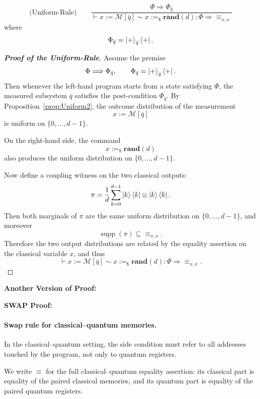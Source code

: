 \documentclass{report}
\theoremstyle{defn_style}
\begin{document}
\begin{equation*}
    \text{({Uniform-Rule})}\qquad
    \frac{\Phi \Longrightarrow\Phi_{\bar{q}}}
    {\vdash x:=\mathcal{M}[\bar{q}] \sim x:=_{\$}\textbf{rand}(d): \Phi \Longrightarrow \equiv_{x,x}}
\end{equation*}
where
$$
\Phi_{\bar{q}}=\ket{+}_{\bar{q}}\bra{+}.
$$



\begin{proof}[\textbf{Proof of the Uniform-Rule}]
Assume the premise
$$
\Phi \Longrightarrow \Phi_{\bar q},
\qquad
\Phi_{\bar q}=\ket{+}_{\bar q}\bra{+}.
$$
Then whenever the left-hand program starts from a state satisfying $\Phi$, the measured subsystem $\bar q$ satisfies the post-condition $\Phi_{\bar q}$. By Proposition~\ref{prop:Uniform2}, the outcome distribution of the measurement
$$
x:=\mathcal M[\bar q]
$$
is uniform on $\{0,\dots,d-1\}$.

On the right-hand side, the command
$$
x:=_{\$}\textbf{rand}(d)
$$
also produces the uniform distribution on $\{0,\dots,d-1\}$.

Now define a coupling witness on the two classical outputs:
$$
\pi=\frac{1}{d}\sum_{k=0}^{d-1}\ket{k}\bra{k}\otimes\ket{k}\bra{k}.
$$
Then both marginals of $\pi$ are the same uniform distribution on $\{0,\dots,d-1\}$, and moreover
$$
\operatorname{supp}(\pi)\subseteq \equiv_{x,x}.
$$
Therefore the two output distributions are related by the equality assertion on the classical variable $x$, and thus
$$
\vdash x:=\mathcal{M}[\bar{q}] \sim x:=_{\$}\textbf{rand}(d): \Phi \Longrightarrow \equiv_{x,x}.
$$
\end{proof}





\textbf{Another Version of Proof:}


\textbf{SWAP Proof:}


\paragraph{Swap rule for classical--quantum memories.}
In the classical--quantum setting, the side condition must refer to all addresses
touched by the program, not only to quantum registers.

We write $\equiv$ for the full classical--quantum equality assertion:
its classical part is equality of the paired classical memories, and its quantum part
is equality of the paired quantum registers.
\end{document}
